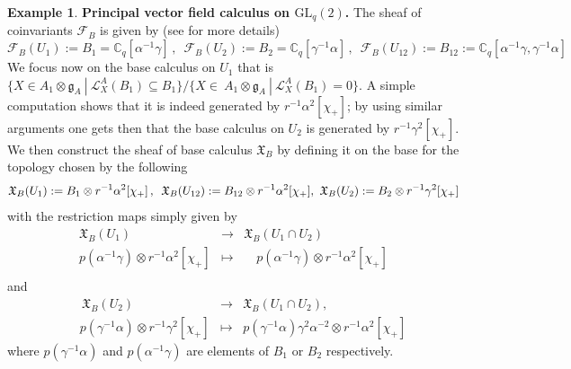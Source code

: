 \documentclass{article}
\theoremstyle{definition}
\newtheorem{example}[thm]{Example}
\newcommand{\C}{{\mathbb{C}}}
\newcommand{\lra}{{\longrightarrow}}
\newcommand{\Chi}{{\mathfrak{X}}}
\newcommand{\cF}{{\mathcal{F}}}
\begin{document}
{\begin{example} {\bf Principal vector field calculus on $\mathrm{GL}_q(2)$.}
	The sheaf of coinvariants $\cF_B$ is given by (see \cite{afl} for more details)
	$$
	\cF_B(U_1):=B_1=\C_q[\alpha^{-1}\gamma]\,,\,\,\,\cF_B(U_2):=B_2=\C_q[\gamma^{-1}\alpha]\,,\,\,\,\cF_B(U_{12}):=B_{12}:=\C_q[\alpha^{-1}\gamma,\gamma^{-1}\alpha]
	$$
	We focus now on the base calculus on $U_1$ that is $\{X\in A_1\otimes\mathfrak{g}_A~|~\mathscr{L}^A_X(B_1)\subseteq B_1\}\bigg/\{X\in\ A_1\otimes\mathfrak{g}_A~|~\mathscr{L}^A_X(B_1)=0\}$. A simple computation shows that it is indeed generated by $ r^{-1} \alpha^2 [\chi_+]$; by using similar arguments one gets then that the base calculus on $U_2$ is generated by $ r^{-1} \gamma^2 [\chi_+]$. We then construct the sheaf of base calculus $\Chi_B$ by defining it on the base for the topology chosen by the following
	$$
	\Chi_B(U_1):=B_1\otimes r^{-1} \alpha^2 [\chi_+]\,,\,\,\,\Chi_B(U_{12}):=B_{12}\otimes r^{-1} \alpha^2 [\chi_+]\,\\,\,\,\Chi_B(U_2):=B_2\otimes r^{-1} \gamma^2 [\chi_+]
	$$
	with the restriction maps simply given by
	$$
	\begin{array}{ccc}
		\Chi_{B}(U_1) & \lra &\Chi_{B}(U_1 \cap U_2)\\
		p(\alpha^{-1}\gamma)\otimes r^{-1} \alpha^2 [\chi_+] & \mapsto &\quad p(\alpha^{-1}\gamma)\otimes r^{-1} \alpha^2 [\chi_+]\\
	\end{array}
	$$
	and
	$$
	\begin{array}{ccc}
		\,\,\,\,\,\,\,\,\,\,\Chi_{B}(U_2)  & \lra  & \Chi_{B} (U_1 \cap U_2), \\
		\,\,\,\,\,\,\,\,\,p(\gamma^{-1}\alpha)\otimes r^{-1} \gamma^2 [\chi_+] & \mapsto  & p(\gamma^{-1}\alpha)\gamma^2\alpha^{-2}\otimes r^{-1} \alpha^2 [\chi_+]
	\end{array}
	$$
	where $p(\gamma^{-1}\alpha)$ and $p(\alpha^{-1}\gamma)$ are elements of $B_1$ or $B_2$ respectively.
	

\end{example}}
\end{document}
